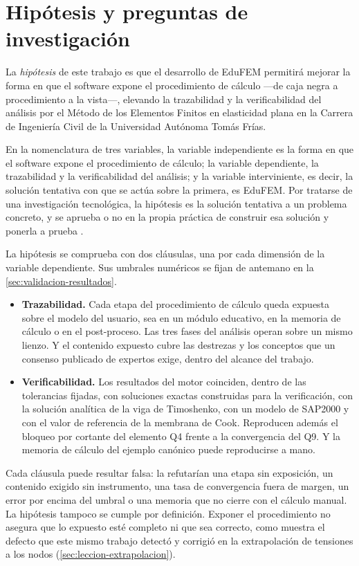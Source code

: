 \section*{Hipótesis y preguntas de investigación}

La \emph{hipótesis} de este trabajo es que el desarrollo de EduFEM permitirá mejorar la forma en que el software expone el procedimiento de cálculo —de caja negra a procedimiento a la vista—, elevando la trazabilidad y la verificabilidad del análisis por el Método de los Elementos Finitos en elasticidad plana en la Carrera de Ingeniería Civil de la Universidad Autónoma Tomás Frías.

En la nomenclatura de tres variables, la variable independiente es la forma en que el software expone el procedimiento de cálculo; la variable dependiente, la trazabilidad y la verificabilidad del análisis; y la variable interviniente, es decir, la solución tentativa con que se actúa sobre la primera, es EduFEM. Por tratarse de una investigación tecnológica, la hipótesis es la solución tentativa a un problema concreto, y se aprueba o no en la propia práctica de construir esa solución y ponerla a prueba \autocite[p.~85]{garciacordoba2005tecnologica}.

La hipótesis se comprueba con dos cláusulas, una por cada dimensión de la variable dependiente. Sus umbrales numéricos se fijan de antemano en la \autoref{sec:validacion-resultados}.

\begin{itemize}
    \item[(a)] \textbf{Trazabilidad.} Cada etapa del procedimiento de cálculo queda expuesta sobre el modelo del usuario, sea en un módulo educativo, en la memoria de cálculo o en el post-proceso. Las tres fases del análisis operan sobre un mismo lienzo. Y el contenido expuesto cubre las destrezas y los conceptos que un consenso publicado de expertos exige, dentro del alcance del trabajo.
    \item[(b)] \textbf{Verificabilidad.} Los resultados del motor coinciden, dentro de las tolerancias fijadas, con soluciones exactas construidas para la verificación, con la solución analítica de la viga de Timoshenko, con un modelo de SAP2000 y con el valor de referencia de la membrana de Cook. Reproducen además el bloqueo por cortante del elemento Q4 frente a la convergencia del Q9. Y la memoria de cálculo del ejemplo canónico puede reproducirse a mano.
\end{itemize}

Cada cláusula puede resultar falsa: la refutarían una etapa sin exposición, un contenido exigido sin instrumento, una tasa de convergencia fuera de margen, un error por encima del umbral o una memoria que no cierre con el cálculo manual. La hipótesis tampoco se cumple por definición. Exponer el procedimiento no asegura que lo expuesto esté completo ni que sea correcto, como muestra el defecto que este mismo trabajo detectó y corrigió en la extrapolación de tensiones a los nodos (\autoref{sec:leccion-extrapolacion}).

